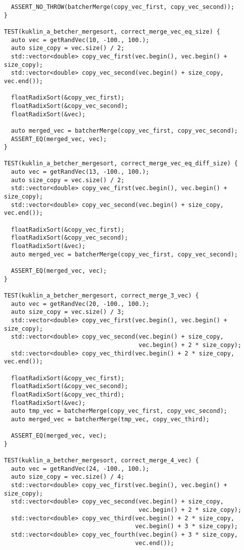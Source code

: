\documentclass{report}
\begin{document}
\begin{lstlisting}
  ASSERT_NO_THROW(batcherMerge(copy_vec_first, copy_vec_second));
}

TEST(kuklin_a_betcher_mergesort, correct_merge_vec_eq_size) {
  auto vec = getRandVec(10, -100., 100.);
  auto size_copy = vec.size() / 2;
  std::vector<double> copy_vec_first(vec.begin(), vec.begin() + size_copy);
  std::vector<double> copy_vec_second(vec.begin() + size_copy, vec.end());

  floatRadixSort(&copy_vec_first);
  floatRadixSort(&copy_vec_second);
  floatRadixSort(&vec);

  auto merged_vec = batcherMerge(copy_vec_first, copy_vec_second);
  ASSERT_EQ(merged_vec, vec);
}

TEST(kuklin_a_betcher_mergesort, correct_merge_vec_eq_diff_size) {
  auto vec = getRandVec(13, -100., 100.);
  auto size_copy = vec.size() / 2;
  std::vector<double> copy_vec_first(vec.begin(), vec.begin() + size_copy);
  std::vector<double> copy_vec_second(vec.begin() + size_copy, vec.end());

  floatRadixSort(&copy_vec_first);
  floatRadixSort(&copy_vec_second);
  floatRadixSort(&vec);
  auto merged_vec = batcherMerge(copy_vec_first, copy_vec_second);

  ASSERT_EQ(merged_vec, vec);
}

TEST(kuklin_a_betcher_mergesort, correct_merge_3_vec) {
  auto vec = getRandVec(20, -100., 100.);
  auto size_copy = vec.size() / 3;
  std::vector<double> copy_vec_first(vec.begin(), vec.begin() + size_copy);
  std::vector<double> copy_vec_second(vec.begin() + size_copy,
                                      vec.begin() + 2 * size_copy);
  std::vector<double> copy_vec_third(vec.begin() + 2 * size_copy, vec.end());

  floatRadixSort(&copy_vec_first);
  floatRadixSort(&copy_vec_second);
  floatRadixSort(&copy_vec_third);
  floatRadixSort(&vec);
  auto tmp_vec = batcherMerge(copy_vec_first, copy_vec_second);
  auto merged_vec = batcherMerge(tmp_vec, copy_vec_third);

  ASSERT_EQ(merged_vec, vec);
}

TEST(kuklin_a_betcher_mergesort, correct_merge_4_vec) {
  auto vec = getRandVec(24, -100., 100.);
  auto size_copy = vec.size() / 4;
  std::vector<double> copy_vec_first(vec.begin(), vec.begin() + size_copy);
  std::vector<double> copy_vec_second(vec.begin() + size_copy,
                                      vec.begin() + 2 * size_copy);
  std::vector<double> copy_vec_third(vec.begin() + 2 * size_copy,
                                     vec.begin() + 3 * size_copy);
  std::vector<double> copy_vec_fourth(vec.begin() + 3 * size_copy,
                                     vec.end());


\end{lstlisting}
\end{document}
